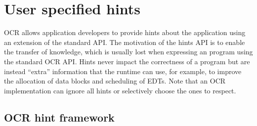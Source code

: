 \section{User specified hints}
OCR allows application developers to provide hints about the application using
an extension of the standard API. The motivation of the hints API is to enable
the transfer of knowledge, which is usually lost when expressing an program
using the standard OCR API. Hints never impact the correctness of a program but
are instead “extra” information that the runtime can use, for example, to
improve the allocation of data blocks and scheduling of EDTs. Note that an OCR
implementation can ignore all hints or selectively choose the ones to respect.

\subsection{OCR hint framework}
